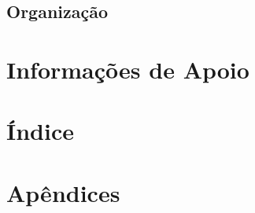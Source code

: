 \documentclass[12pt,a4paper,onecolumn,titlepage]{article}
\begin{document}
\subsection{Organização}
\section{Informações de Apoio}
\label{apoio}

\section{Índice}
\label{sect:indice}

\section{Apêndices}
\label{sect:apendices}




%
%
\end{document}

